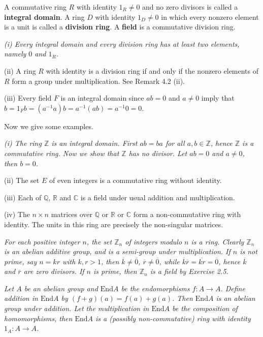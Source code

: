 \begin{definition}
A commutative ring $R$ with identity $1_R\ne 0$ and no zero divisors is called a \textbf{integral domain}. A ring $D$ with identity $1_D\ne 0$ in which every nonzero element is a unit is called a \textbf{division ring}. A \textbf{field} is a commutative division ring.
\end{definition}
\begin{note}\em
(i) Every integral domain and every division ring has at least two elements, namely $0$ and $1_R$.\par
(ii) A ring $R$ with identity is a division ring if and only if the nonzero elements of $R$ form a group under multiplication. See Remark 4.2 (ii).\par
(iii) Every field $F$ is an integral domain since $ab=0$ and $a\ne 0$ imply that $b=1_Fb=(a^{-1}a)b=a^{-1}(ab)=a^{-1}0=0$.
\end{note}
Now we give some examples.
\begin{example}\em
(i) The ring $\mathbb{Z}$ is an integral domain. First $ab=ba$ for all $a,b\in\mathbb{Z}$, hence $\mathbb{Z}$ is a commutative ring. Now we show that $\mathbb{Z}$ has no divisor. Let $ab=0$ and $a\ne 0$, then $b=0$.\par
(ii) The set $E$ of even integers is a commutative ring without identity.\par
(iii) Each of $\mathbb{Q}$, $\mathbb{R}$ and $\mathbb{C}$ is a field under usual addition and multiplication.\par
(iv) The $n\times n$ matrices over $\mathbb{Q}$ or $\mathbb{R}$ or $\mathbb{C}$ form a non-commutative ring with identity. The units in this ring are precisely the non-singular matrices.
\end{example}
\begin{example}\em
For each positive integer $n$, the set $\mathbb{Z}_n$ of integers modulo $n$ is a ring. Clearly $\mathbb{Z}_n$ is an abelian additive group, and is a semi-group under multiplication. If $n$ is not prime, say $n=kr$ with $k,r>1$, then $\overline{k}\ne\overline{0}$, $\overline{r}\ne\overline{0}$, while $\overline{k}\overline{r}=\overline{kr}=\overline{0}$, hence $\overline{k}$ and $\overline{r}$ are zero divisors. If $n$ is prime, then $\mathbb{Z}_n$ is a field by Exercise 2.5.
\end{example}
\begin{example}\em
Let $A$ be an abelian group and $\mathrm{End}A$ be the endomorphisms $f:A\to A$. Define addition in $\mathrm{End}A$ by $(f+g)(a)=f(a)+g(a)$. Then $\mathrm{End}A$ is an abelian group under addition. Let the multiplication in $\mathrm{End}A$ be the composition of homomorphisms, then $\mathrm{End}A$ is a (possibly non-commutative) ring with identity $1_A:A\to A$.
\end{example}
